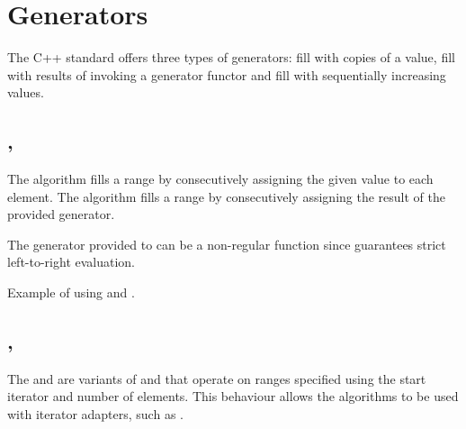 \section{Generators}

The C++ standard offers three types of generators: fill with copies of a value, fill with results of invoking a generator functor and fill with sequentially increasing values.

\subsection{\texorpdfstring{, }{\texttt{std::fill}, \texttt{std::generate}}}

The  algorithm fills a range by consecutively assigning the given value to each element.
The  algorithm fills a range by consecutively assigning the result of the provided generator.



The generator provided to  can be a non-regular function since  guarantees strict left-to-right evaluation.

\begin{codebox}[]{\href{https://compiler-explorer.com/z/6dnTG7Mqo}{\ExternalLink}}
\footnotesize Example of using  and .
\tcblower
{}
\end{codebox}

\subsection{\texorpdfstring{, }{\texttt{std::fill\_n}, \texttt{std::generate\_n}}}

The  and  are variants of  and \newline{} that operate on ranges specified using the start iterator and number of elements. This behaviour allows the algorithms to be used with iterator adapters, such as .

